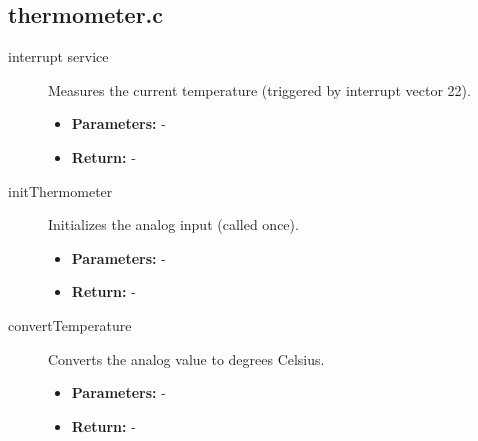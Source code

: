 \documentclass[a4paper,12pt]{article}
\begin{document}
\subsection{thermometer.c}

\begin{description}
    \item[interrupt service] Measures the current temperature (triggered by interrupt vector 22).
    \begin{itemize}
        \item \textbf{Parameters:} -
        \item \textbf{Return:} -
    \end{itemize}
    
    \item[initThermometer] Initializes the analog input (called once).
    \begin{itemize}
        \item \textbf{Parameters:} -
        \item \textbf{Return:} -
    \end{itemize}
    
    \item[convertTemperature] Converts the analog value to degrees Celsius.
    \begin{itemize}
        \item \textbf{Parameters:} -
        \item \textbf{Return:} -
    \end{itemize}
\end{description}
\end{document}
